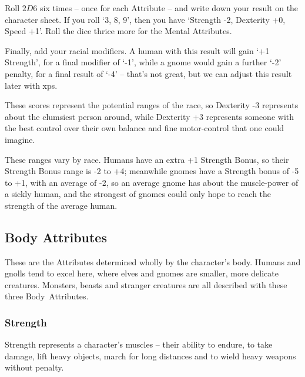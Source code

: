 \begin{multicols}{2}

\sidebox[18]{
  \attributeChart
}
\noindent
Roll $2D6$ six times -- once for each Attribute -- and write down your result on the character sheet.
If you roll `3, 8, 9', then you have `Strength -2, Dexterity +0, Speed +1'.
Roll the dice thrice more for the Mental Attributes.

Finally, add your racial modifiers.
A human with this result will gain `+1 Strength', for a final modifier of `-1', while a gnome would gain a further `-2' penalty, for a final result of `-4' -- that's not great, but we can adjust this result later with \glspl{xp}.

These scores represent the potential ranges of the race, so Dexterity -3 represents about the clumsiest person around, while Dexterity +3 represents someone with the best control over their own balance and fine motor-control that one could imagine.

These ranges vary by race.
Humans have an extra +1 Strength Bonus, so their Strength Bonus range is -2 to +4; meanwhile gnomes have a Strength bonus of -5 to +1, with an average of -2, so an average gnome has about the muscle-power of a sickly human, and the strongest of gnomes could only hope to reach the strength of the average human.



\subsection{Body Attributes}

These are the Attributes determined wholly by the character's body.
Humans and gnolls tend to excel here, where elves and gnomes are smaller, more delicate creatures.
Monsters, beasts and stranger creatures are all described with these three Body~Attributes.


\subsubsection[Strength]{Strength }

Strength represents a character's muscles -- their ability to endure, to take damage, lift heavy objects, march for long distances and to wield heavy weapons without penalty.


\end{multicols}
